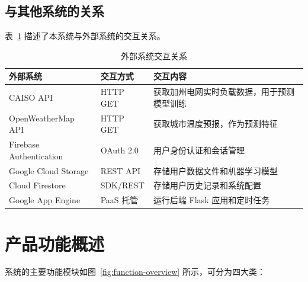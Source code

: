 \subsection{与其他系统的关系}

表~\ref{tab:external-systems} 描述了本系统与外部系统的交互关系。

\begin{table}[htbp]
    \centering
    \caption{外部系统交互关系}
    \label{tab:external-systems}
    \begin{tabularx}{\textwidth}{@{}l l X@{}}
        \toprule
        \textbf{外部系统}           & \textbf{交互方式} & \textbf{交互内容}         \\
        \midrule
        CAISO API               & HTTP GET      & 获取加州电网实时负载数据，用于预测模型训练 \\
        OpenWeatherMap API      & HTTP GET      & 获取城市温度预报，作为预测特征       \\
        Firebase Authentication & OAuth 2.0     & 用户身份认证和会话管理           \\
        Google Cloud Storage    & REST API      & 存储用户数据文件和机器学习模型       \\
        Cloud Firestore         & SDK/REST      & 存储用户历史记录和系统配置         \\
        Google App Engine       & PaaS 托管       & 运行后端 Flask 应用和定时任务    \\
        \bottomrule
    \end{tabularx}
\end{table}

\section{产品功能概述}

系统的主要功能模块如图~\ref{fig:function-overview} 所示，可分为四大类：


